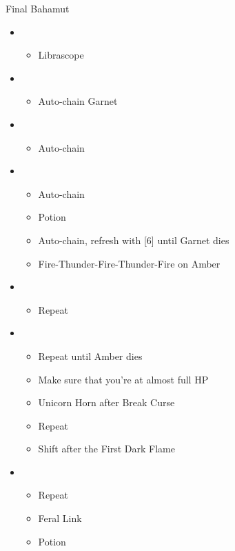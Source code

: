\begin{battle}{Final Bahamut}
	\begin{flushleft}
		\begin{itemize}
			\item \sixth
			      \begin{itemize}
				      \item Librascope
			      \end{itemize}
			\item \fifth
			      \begin{itemize}
				      \item Auto-chain Garnet
			      \end{itemize}
			\item \third
			      \begin{itemize}
				      \item Auto-chain
			      \end{itemize}
			\item \fifth
			      \begin{itemize}
				      \item Auto-chain
				      \item Potion
				      \item Auto-chain, refresh with [6] until Garnet dies
				      \item Fire-Thunder-Fire-Thunder-Fire on Amber
			      \end{itemize}
			\item \third
			      \begin{itemize}
				      \item Repeat
			      \end{itemize}
			\item \fifth
			      \begin{itemize}
				      \item Repeat until Amber dies
				      \item Make sure that you're at almost full HP
				      \item Unicorn Horn after Break Curse
				      \item Repeat
				      \item Shift after the First Dark Flame
			      \end{itemize}
			\item \second
			      \begin{itemize}
				      \item Repeat
				      \item Feral Link
				      \item Potion

\end{itemize}
\end{itemize}
\end{flushleft}
\end{battle}
